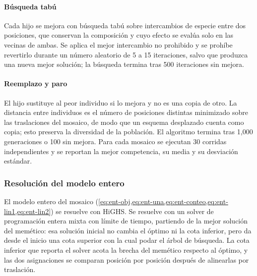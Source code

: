 \paragraph{Búsqueda tabú} Cada hijo se mejora con búsqueda tabú \autocite{glover1989,hertz1987} sobre intercambios de especie entre dos posiciones, que conservan la composición y cuyo efecto se evalúa solo en las vecinas de ambas. Se aplica el mejor intercambio no prohibido y se prohíbe revertirlo durante un número aleatorio de 5 a 15 iteraciones, salvo que produzca una nueva mejor solución; la búsqueda termina tras 500 iteraciones sin mejora.

\paragraph{Reemplazo y paro} El hijo sustituye al peor individuo si lo mejora y no es una copia de otro. La distancia entre individuos es el número de posiciones distintas minimizado sobre las traslaciones del mosaico, de modo que un esquema desplazado cuenta como copia; esto preserva la diversidad de la población. El algoritmo termina tras 1{,}000 generaciones o 100 sin mejora. Para cada mosaico se ejecutan 30 corridas independientes y se reportan la mejor competencia, su media y su desviación estándar.

\subsubsection{Resolución del modelo entero}
\label{subsec:ple-solucion}

El modelo entero del mosaico (\cref{eq:ent-obj,eq:ent-una,eq:ent-conteo,eq:ent-lin1,eq:ent-lin2}) se resuelve con HiGHS. Se resuelve con un solver de programación entera mixta con límite de tiempo, partiendo de la mejor solución del memético: esa solución inicial no cambia el óptimo ni la cota inferior, pero da desde el inicio una cota superior con la cual podar el árbol de búsqueda. La cota inferior que reporta el solver acota la brecha del memético respecto al óptimo, y las dos asignaciones se comparan posición por posición después de alinearlas por traslación.
